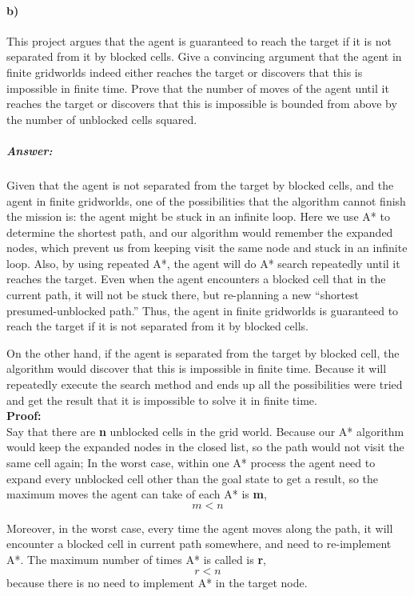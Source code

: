 \documentclass[11pt]{report}
\begin{document}
\paragraph{b)}
This project argues that the agent is guaranteed to reach the target if it is not separated from it by blocked cells. Give a convincing argument that the agent in finite gridworlds indeed either reaches the target or discovers that this is impossible in finite time. Prove that the number of moves of the agent until it reaches the target or discovers that this is impossible is bounded from above by the number of unblocked cells squared.\\

\subparagraph{Answer:}
Given that the agent is not separated from the target by blocked cells, and the agent in finite gridworlds, one of the possibilities that the algorithm cannot finish the mission is: the agent might be stuck in an infinite loop. Here we use A* to determine the shortest path, and our algorithm would remember the expanded nodes, which prevent us from keeping visit the same node and stuck in an infinite loop. Also, by using repeated A*, the agent will do A* search repeatedly until it reaches the target. Even when the agent encounters a blocked cell that in the current path, it will not be stuck there, but re-planning a new “shortest presumed-unblocked path.” Thus, the agent in finite gridworlds is guaranteed to reach the target if it is not separated from it by blocked cells.

On the other hand, if the agent is separated from the target by blocked cell, the algorithm would discover that this is impossible in finite time. Because it will repeatedly execute the search method and ends up all the possibilities were tried and get the result that it is impossible to solve it in finite time.\\

\textbf{Proof:}\\

\indent Say that there are \textbf{n} unblocked cells in the grid world. Because our A* algorithm would keep the expanded nodes in the closed list, so the path would not visit the same cell again; In the worst case, within one A* process the agent need to expand every unblocked cell other than the goal state to get a result, so the maximum moves the agent can take of each A* is \textbf{m}, $$m < n$$

Moreover, in the worst case, every time the agent moves along the path, it will encounter a blocked cell in current path somewhere, and need to re-implement A*. The maximum number of times A* is called is \textbf{r}, $$r<n$$ because there is no need to implement A* in the target node.
\end{document}
